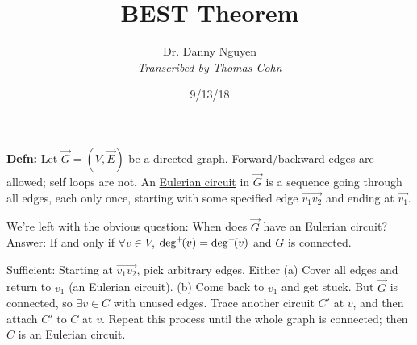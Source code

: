 \documentclass[10pt,letterpaper]{article}
\author{Dr. Danny Nguyen\\ \small\textit{Transcribed by Thomas Cohn}}
\title{BEST Theorem}
\date{9/13/18} %
\newcommand{\n}{\hfill\break}
\newcommand{\defn}[1]{\par\noindent\settowidth{\hangindent}{\textbf{Defn: }}\textbf{Defn: }#1\n}
\newcommand{\ptxt}[1]{\textrm{\textnormal{#1}}}
\newcommand{\degp}[1]{\ptxt{deg}^{+}\!\!\left(#1\right)}
\newcommand{\degn}[1]{\ptxt{deg}^{-}\!\!\left(#1\right)}
\begin{document}
\maketitle
\setlength\RaggedRightParindent{\parindent}
\RaggedRight

\defn{Let $\vec{G}=(V,\vec{E})$ be a directed graph. Forward/backward edges are allowed; self loops are not. An \underline{Eulerian circuit} in $\vec{G}$ is a sequence going through all edges, each only once, starting with some specified edge $\vec{v_{1}v_{2}}$ and ending at $\vec{v_{1}}$.}

\par\noindent We're left with the obvious question: When does $\vec{G}$ have an Eulerian circuit?\n
Answer: If and only if $\forall{}v\in{}V$, $\degp{v}=\degn{v}$ and $G$ is connected.\n

\par\noindent Sufficient: Starting at $\vec{v_{1}v_{2}}$, pick arbitrary edges. Either\n
(a) Cover all edges and return to $v_{1}$ (an Eulerian circuit).\n
(b) Come back to $v_{1}$ and get stuck. But $\vec{G}$ is connected, so $\exists{}v\in{}C$ with unused edges. Trace another\n
\phantom{(b) }circuit $C'$ at $v$, and then attach $C'$ to $C$ at $v$. Repeat this process until the whole graph is connected;\n
\phantom{(b) }then $C$ is an Eulerian circuit.\n
\end{document}
